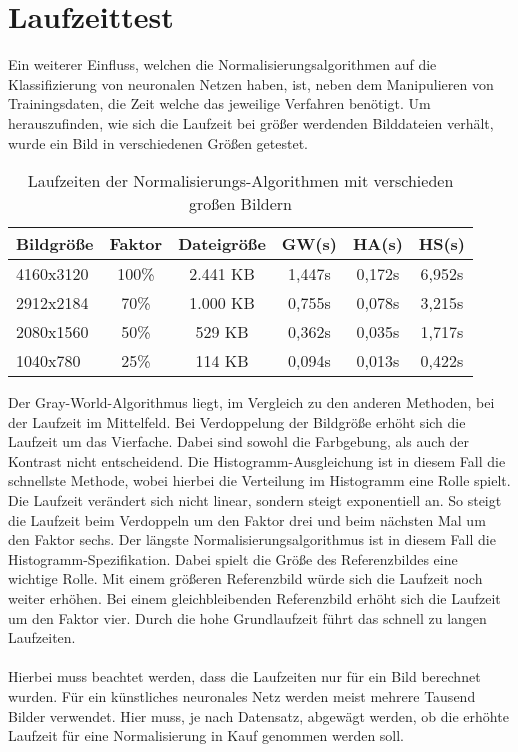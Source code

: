 \section{Laufzeittest}
Ein weiterer Einfluss, welchen die Normalisierungsalgorithmen auf die Klassifizierung von neuronalen Netzen haben, ist, neben dem Manipulieren von Trainingsdaten, die Zeit welche das jeweilige Verfahren benötigt. Um herauszufinden, wie sich die Laufzeit bei größer werdenden Bilddateien verhält, wurde ein Bild in verschiedenen Größen getestet.
\begin{table}
[h]
\caption{Laufzeiten der Normalisierungs-Algorithmen mit verschieden großen Bildern}
\centering
\begin{tabular}{|l|c|c|c|c|c|}
\hline
Bildgröße & Faktor & Dateigröße & GW(s) & HA(s) & HS(s)\\
\hline
4160x3120 & 100\% & 2.441 KB & 1,447s & 0,172s & 6,952s\\
2912x2184 & 70\% & 1.000 KB & 0,755s & 0,078s & 3,215s\\
2080x1560 & 50\% & 529 KB & 0,362s & 0,035s & 1,717s\\
1040x780 & 25\% & 114 KB & 0,094s & 0,013s & 0,422s\\
\hline
\end{tabular}
\end{table}
Der Gray-World-Algorithmus liegt, im Vergleich zu den anderen Methoden, bei der Laufzeit im Mittelfeld. Bei Verdoppelung der Bildgröße erhöht sich die Laufzeit um das Vierfache. Dabei sind sowohl die Farbgebung, als auch der Kontrast nicht entscheidend. Die Histogramm-Ausgleichung ist in diesem Fall die schnellste Methode, wobei hierbei die Verteilung im Histogramm eine Rolle spielt. Die Laufzeit verändert sich nicht linear, sondern steigt exponentiell an. So steigt die Laufzeit beim Verdoppeln um den Faktor drei und beim nächsten Mal um den Faktor sechs. Der längste Normalisierungsalgorithmus ist in diesem Fall die Histogramm-Spezifikation. Dabei spielt die Größe des Referenzbildes eine wichtige Rolle. Mit einem größeren Referenzbild würde sich die Laufzeit noch weiter erhöhen. Bei einem gleichbleibenden Referenzbild erhöht sich die Laufzeit um den Faktor vier. Durch die hohe Grundlaufzeit führt das schnell zu langen Laufzeiten.\\\\
Hierbei muss beachtet werden, dass die Laufzeiten nur für ein Bild berechnet wurden. Für ein künstliches neuronales Netz werden meist mehrere Tausend Bilder verwendet. Hier muss, je nach Datensatz, abgewägt werden, ob die erhöhte Laufzeit für eine Normalisierung in Kauf genommen werden soll.